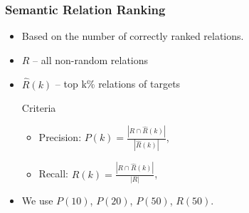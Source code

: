 \documentclass{beamer}
\begin{document}
\begin{frame}
\frametitle{Semantic Relation Ranking}

\begin{itemize}
  
  \item Based on the number of correctly ranked relations.

\item $R$ -- all non-random relations 

\item $\hat{R}(k)$ --  top k\% relations of targets


\begin{block}{Criteria}

	
	\begin{itemize}
		\item Precision: $P(k)=$$\frac{|R \cap \hat{R}(k)|}{|\hat{R}(k)|}$,
		\item Recall: $R(k)=$$\frac{|R \cap \hat{R}(k)|}{|R|}$,
	\end{itemize}	
	\end{block}

\item We use $P(10)$, $P(20)$, $P(50)$, $R(50)$.
	

\end{itemize}
	
	
\end{frame}
\end{document}
